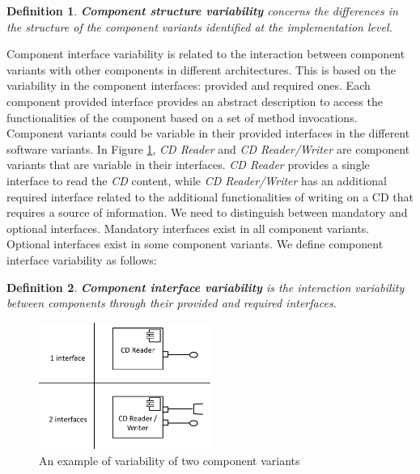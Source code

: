 \documentclass[graybox]{svmult}
\newtheorem{mydef}{Definition}
\begin{document}
\begin{mydef}
\textbf{Component {structure} variability} concerns the differences in the structure of the component variants identified at the implementation level. 
\end{mydef}



Component {interface} variability is related to the interaction between component variants with other components in different architectures. This is based on the variability in the component interfaces: provided and required ones. 
Each component provided interface provides an abstract description to access the functionalities of the component based on a set of method invocations. Component variants could be variable in their provided interfaces in the different software variants. In Figure \ref{fig:interVarEx}, \textit{CD Reader} and \textit{CD Reader/Writer} are component variants that are variable in their interfaces. \textit{CD Reader} provides a single interface to read the \textit{CD} content, while \textit{CD Reader/Writer} has an additional required interface related to the additional functionalities of writing on a CD that requires a source of information. We need to distinguish between mandatory and optional interfaces. Mandatory interfaces exist in all component variants. Optional interfaces exist in some component variants. We define component interface variability as follows:

\begin{mydef}
\textbf{Component {interface} variability} is the interaction variability between components through their provided and required interfaces.
\end{mydef}


\begin{figure}[h]
\centering
\includegraphics[width=0.5\textwidth]{figs/interfaceVarExample.png}
\caption{An example of variability of two component variants}
\label{fig:interVarEx}
\end{figure}
\end{document}
